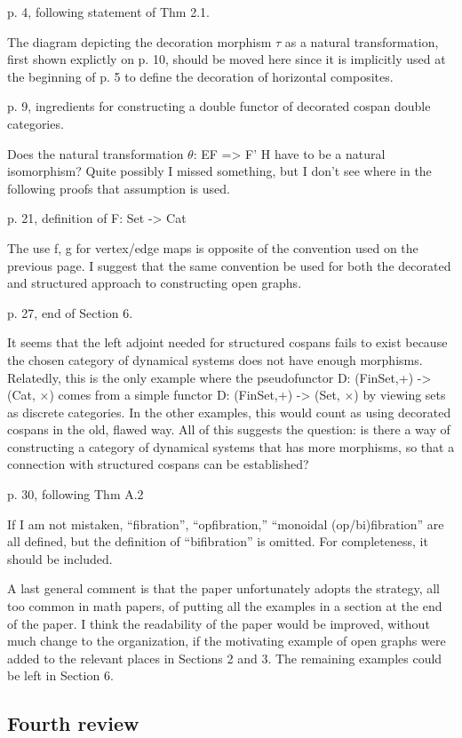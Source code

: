 \documentclass[reqno]{amsart}
\begin{document}
{p. 4, following statement of Thm 2.1.

The diagram depicting the decoration morphism $\tau$ as a natural transformation, first shown explictly on p. 10, should be moved here since it is 
implicitly used at the beginning of p. 5 to define the decoration of horizontal composites.

p. 9, ingredients for constructing a double functor of decorated cospan double categories.

Does the natural transformation $\theta$: EF => F’ H have to be a natural isomorphism? Quite possibly I missed something, but I don’t see where in 
the following proofs that assumption is used.

p. 21, definition of F: Set -> Cat

The use f, g for vertex/edge maps is opposite of the convention used on the previous page. I suggest that the same convention be used for both the 
decorated and structured approach to constructing open graphs.

p. 27, end of Section 6.

It seems that the left adjoint needed for structured cospans fails to exist because the chosen category of dynamical systems does not have enough 
morphisms. Relatedly, this is the only example where the pseudofunctor D: (FinSet,+) -> (Cat, $\times$) comes from a simple functor D: (FinSet,+) -> 
(Set, $\times$) by viewing sets as discrete categories. In the other examples, this would count as using decorated cospans in the old, flawed way. 
All of this suggests the question: is there a way of constructing a category of dynamical systems that has more morphisms, so that a connection with 
structured cospans can be established?

p. 30, following Thm A.2

If I am not mistaken, “fibration”, “opfibration,” “monoidal (op/bi)fibration” are all defined, but the definition of “bifibration” is omitted. For 
completeness, it should be included.

A last general comment is that the paper unfortunately adopts the strategy, all too common in math papers, of putting all the examples in a section at 
the end of the paper. I think the readability of the paper would be improved, without much change to the organization, if the motivating example of 
open graphs were added to the relevant places in Sections 2 and 3. The remaining examples could be left in Section 6.
}

\subsection{Fourth review}
\end{document}
